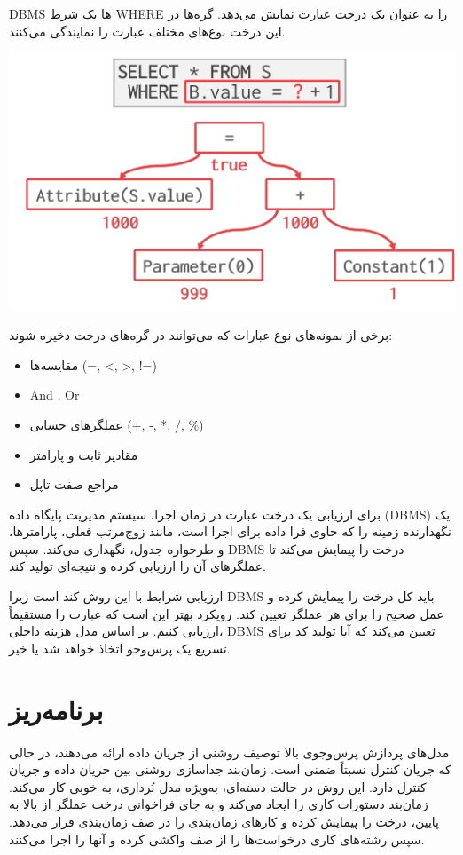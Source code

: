 DBMS
ها یک شرط WHERE را به عنوان یک درخت عبارت نمایش می‌دهد. گره‌ها در این درخت نوع‌های مختلف عبارت را نمایندگی می‌کنند.

\qquad\qquad\qquad	\includegraphics[width=0.7\linewidth]{screenshot007}


برخی از نمونه‌های نوع عبارات که می‌توانند در گره‌های درخت ذخیره شوند:
\begin{itemize}
	\item مقایسه‌ها (=, <, >, !=)
	\item And , Or
	\item عملگرهای حسابی (+, -, *, /, \%)
	\item مقادیر ثابت و پارامتر
	\item مراجع صفت تاپل
\end{itemize}

برای ارزیابی یک درخت عبارت در زمان اجرا، سیستم مدیریت پایگاه داده (DBMS) یک نگهدارنده زمینه را که حاوی فرا داده برای اجرا است، مانند زوج‌مرتب فعلی، پارامترها، و طرحواره جدول، نگهداری می‌کند. سپس DBMS درخت را پیمایش می‌کند تا عملگرهای آن را ارزیابی کرده و نتیجه‌ای تولید کند.

ارزیابی شرایط با این روش کند است زیرا DBMS باید کل درخت را پیمایش کرده و عمل صحیح را برای هر عملگر تعیین کند. رویکرد بهتر این است که عبارت را مستقیماً ارزیابی کنیم. بر اساس مدل هزینه داخلی، DBMS تعیین می‌کند که آیا تولید کد برای تسریع یک پرس‌وجو اتخاذ خواهد شد یا خیر.

\pagebreak
\section{برنامه‌ریز}

مدل‌های پردازش پرس‌وجوی بالا توصیف روشنی از جریان داده ارائه می‌دهند، در حالی که جریان کنترل نسبتاً ضمنی است. زمان‌بند جداسازی روشنی بین جریان داده و جریان کنترل دارد. این روش در حالت دسته‌ای، به‌ویژه مدل بُرداری، به خوبی کار می‌کند. زمان‌بند دستورات کاری را ایجاد می‌کند و به جای فراخوانی درخت عملگر از بالا به پایین، درخت را پیمایش کرده و کارهای زمان‌بندی را در صف زمان‌بندی قرار می‌دهد. سپس رشته‌های کاری درخواست‌ها را از صف واکشی کرده و آنها را اجرا می‌کنند.



